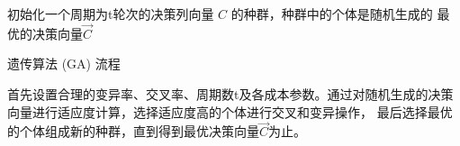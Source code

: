 \documentclass[withoutpreface,bwprint]{cumcmthesis} %
\begin{document}
\begin{adjustbox}{width=16cm,height=6.5cm}
	\centering
	\begin{algorithm}[H]
		\SetAlgoLined
		初始化一个周期为t轮次的决策列向量 $C$ 的种群，种群中的个体是随机生成的\;
	    \Return 最优的决策向量$\vec{C}$
		\caption{遗传算法 (GA) 流程}
	\end{algorithm}
\end{adjustbox}	
首先设置合理的变异率、交叉率、周期数t及各成本参数。通过对随机生成的决策向量进行适应度计算，选择适应度高的个体进行交叉和变异操作，
最后选择最优的个体组成新的种群，直到得到最优决策向量$\vec{C}$为止。
\end{document}
